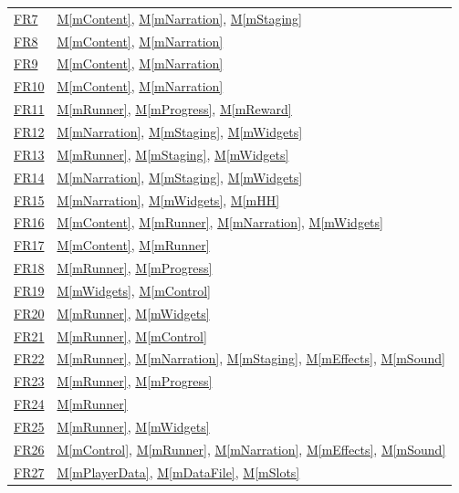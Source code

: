 \documentclass[10pt, titlepage]{article}
\newcommand{\srsurl}{https://team-hindsight.github.io/ophthamology-game/SRS/SRS.pdf}
\newcommand{\srsitemref}[2]{\href{\srsurl\#nameddest=#1}{#2}}
\newcommand{\mref}[1]{\texorpdfstring{\hyperref[md:#1]{M\ref*{#1}}}{M\ref*{#1}}}
\begin{document}
\begin{longtable}{@{}p{}p{}@{}}
\srsitemref{FR_DescribeSensations}{FR7} & \mref{mContent}, \mref{mNarration}, \mref{mStaging} \\
\srsitemref{FR_TruthfulSensations}{FR8} & \mref{mContent}, \mref{mNarration} \\
\srsitemref{FR_ClinicsDiffer}{FR9} & \mref{mContent}, \mref{mNarration} \\
\srsitemref{FR_SpeakUp}{FR10} & \mref{mContent}, \mref{mNarration} \\
\srsitemref{FR_LevelEnd}{FR11} & \mref{mRunner}, \mref{mProgress}, \mref{mReward} \\
\srsitemref{FR_SpokenInstructions}{FR12} & \mref{mNarration}, \mref{mStaging}, \mref{mWidgets} \\
\srsitemref{FR_HintOnMiss}{FR13} & \mref{mRunner}, \mref{mStaging}, \mref{mWidgets} \\
\srsitemref{FR_VisualCues}{FR14} & \mref{mNarration}, \mref{mStaging}, \mref{mWidgets} \\
\srsitemref{FR_NarrationFallback}{FR15} & \mref{mNarration}, \mref{mWidgets}, \mref{mHH} \\
\srsitemref{FR_RevealAnswer}{FR16} & \mref{mContent}, \mref{mRunner}, \mref{mNarration}, \mref{mWidgets} \\
\srsitemref{FR_ValidQuestions}{FR17} & \mref{mContent}, \mref{mRunner} \\
\srsitemref{FR_NoPenalty}{FR18} & \mref{mRunner}, \mref{mProgress} \\
\srsitemref{FR_IgnoreRepeatedTouches}{FR19} & \mref{mWidgets}, \mref{mControl} \\
\srsitemref{FR_HoldSkip}{FR20} & \mref{mRunner}, \mref{mWidgets} \\
\srsitemref{FR_ExitLevel}{FR21} & \mref{mRunner}, \mref{mControl} \\
\srsitemref{FR_StopOnExit}{FR22} & \mref{mRunner}, \mref{mNarration}, \mref{mStaging}, \mref{mEffects}, \mref{mSound} \\
\srsitemref{FR_ExitKeepsData}{FR23} & \mref{mRunner}, \mref{mProgress} \\
\srsitemref{FR_RestartAfterExit}{FR24} & \mref{mRunner} \\
\srsitemref{FR_RestartLevel}{FR25} & \mref{mRunner}, \mref{mWidgets} \\
\srsitemref{FR_Suspend}{FR26} & \mref{mControl}, \mref{mRunner}, \mref{mNarration}, \mref{mEffects}, \mref{mSound} \\
\srsitemref{FR_PersistState}{FR27} & \mref{mPlayerData}, \mref{mDataFile}, \mref{mSlots} \\

\end{longtable}
\end{document}
